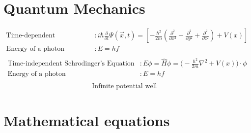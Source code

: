 \documentclass[12pt,a4paper]{article}
\begin{document}
	\section*{Quantum Mechanics}
	\begin{align*}
		\text{Time-dependent Schrodinger's Equation} & : i\hbar \frac{\partial}{\partial t} \Psi (\vec{x}, t) = [-\frac{\hbar^2}{2m}(\frac{\partial ^2}{\partial x^2} + \frac{\partial ^2}{\partial y ^2} + \frac{\partial^2}{\partial z^2}) + V(x)] \\
		\text{Energy of a photon} & : E = hf \\
	\end{align*}
		\begin{align*}
		\text{Time-independent Schrodinger's Equation} & : E\phi = \hat{H}\phi = \Big(-\frac{\hbar^2}{2m}\nabla^2 + V(x) \Big)\cdot \phi \\
		\text{Energy of a photon} & : E = hf \\
	\end{align*}
	\begin{align*}
		\text{Infinite potential well} & 
	\end{align*}
	
	
	
	
	
	
	
	
	
	
	
	
	
	
	
	
	
	
	
	
	
	
	
		\section*{Mathematical equations}
\end{document}
